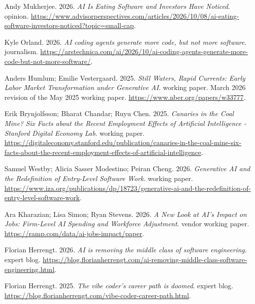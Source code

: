 {\begin{description}[leftmargin=2em,labelwidth=1.5em,itemsep=1pt,parsep=0pt]
\item[108.] \hypertarget{ref-mukherjee2026}{} Andy Mukherjee. 2026. \textit{AI Is Eating Software and Investors Have Noticed}. opinion. \url{https://www.advisorperspectives.com/articles/2026/10/08/ai-eating-software-investors-noticed?topic=small-cap}.

\item[109.] \hypertarget{ref-orland2026}{} Kyle Orland. 2026. \textit{AI coding agents generate more code, but not more software}. journalism. \url{https://arstechnica.com/ai/2026/10/ai-coding-agents-generate-more-code-but-not-more-software/}.

\item[110.] \hypertarget{ref-humlum2026}{} Anders Humlum; Emilie Vestergaard. 2025. \textit{Still Waters, Rapid Currents: Early Labor Market Transformation under Generative AI}. working paper. March 2026 revision of the May 2025 working paper. \url{https://www.nber.org/papers/w33777}.

\item[111.] \hypertarget{ref-stanford2025}{} Erik Brynjolfsson; Bharat Chandar; Ruyu Chen. 2025. \textit{Canaries in the Coal Mine? Six Facts about the Recent Employment Effects of Artificial Intelligence - Stanford Digital Economy Lab}. working paper. \url{https://digitaleconomy.stanford.edu/publication/canaries-in-the-coal-mine-six-facts-about-the-recent-employment-effects-of-artificial-intelligence}.

\item[112.] \hypertarget{ref-westby2026}{} Samuel Westby; Alicia Sasser Modestino; Peiran Cheng. 2026. \textit{Generative AI and the Redefinition of Entry-Level Software Work}. working paper. \url{https://www.iza.org/publications/dp/18723/generative-ai-and-the-redefinition-of-entry-level-software-work}.

\item[113.] \hypertarget{ref-ramp2026}{} Ara Kharazian; Lisa Simon; Ryan Stevens. 2026. \textit{A New Look at AI's Impact on Jobs: Firm-Level AI Spending and Workforce Adjustment}. vendor working paper. \url{https://ramp.com/data/ai-jobs-impact/paper}.

\item[114.] \hypertarget{ref-herrengt2026}{} Florian Herrengt. 2026. \textit{AI is removing the middle class of software engineering}. expert blog. \url{https://blog.florianherrengt.com/ai-removing-middle-class-software-engineering.html}.

\item[115.] \hypertarget{ref-herrengtvibe}{} Florian Herrengt. 2025. \textit{The vibe coder's career path is doomed}. expert blog. \url{https://blog.florianherrengt.com/vibe-coder-career-path.html}.


\end{description}}
